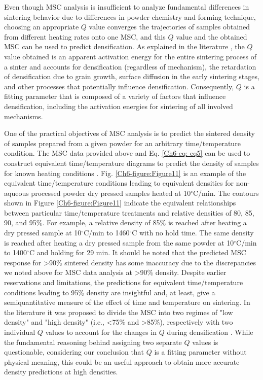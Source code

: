 Even though MSC analysis is insufficient to analyze fundamental differences in sintering behavior due to differences in powder chemistry and forming technique, choosing an appropriate $Q$ value converges the trajectories of samples obtained from different heating rates onto one MSC, and this $Q$ value and the obtained MSC can be used to predict densification. As explained in the literature \cite{Wang2010,Reiterer2009}, the $Q$ value obtained is an apparent activation energy for the entire sintering process of a sinter and accounts for densification (regardless of mechanism), the retardation of densification due to grain growth, surface diffusion in the early sintering stages, and other processes that potentially influence densification. Consequently, $Q$ is a fitting parameter that is composed of a variety of factors that influence densification, including the activation energies for sintering of all involved mechanisms. 

One of the practical objectives of MSC analysis is to predict the sintered density of samples prepared from a given powder for an arbitrary time/temperature condition. The MSC data provided above and Eq. \ref{Ch6-eq: eq5} can be used to construct equivalent time/temperature diagrams to predict the density of samples for known heating conditions \cite{Aminzare2010}. Fig. \ref{Ch6-figure:Figure11} is an example of the equivalent time/temperature conditions leading to equivalent densities for non-aqueous processed powder dry pressed samples heated at 10$^{\circ}$C/min. The contours shown in Figure \ref{Ch6-figure:Figure11} indicate the equivalent relationships between particular time/temperature treatments and relative densities of 80, 85, 90, and 95\%. For example, a relative density of 85\% is reached after heating a dry pressed sample at 10$^{\circ}$C/min to 1460$^{\circ}$C with no hold time. The same density is reached after heating a dry pressed sample from the same powder at 10$^{\circ}$C/min to 1400$^{\circ}$C and holding for 29 min. It should be noted that the predicted MSC response for >90\% sintered density has some inaccuracy due to the discrepancies we noted above for MSC data analysis at >90\% density. Despite earlier reservations and limitations, the predictions for equivalent time/temperature conditions leading to 95\% density are insightful and, at least, give a semiquantitative measure of the effect of time and temperature on sintering. In the literature it was proposed to divide the MSC into two regimes of "low density" and "high density" (i.e., <75\% and >85\%), respectively with two individual $Q$ values to account for the changes in $Q$ during densification \cite{Pouchly2009,Maca2014}. While the fundamental reasoning behind assigning two separate $Q$ values is questionable, considering our conclusion that $Q$ is a fitting parameter without physical meaning, this could be an useful approach to obtain more accurate density predictions at high densities.

